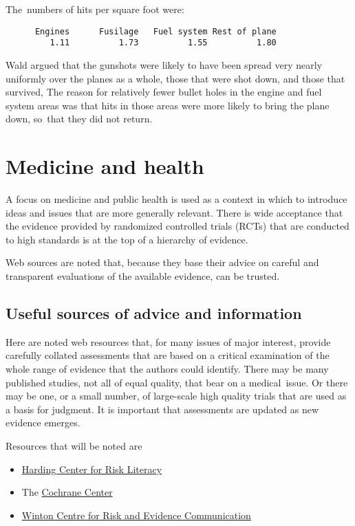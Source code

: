 \documentclass[
  10ptls,
  b5paper]{book}
\providecommand{\tightlist}{%
  \setlength{\itemsep}{0pt}\setlength{\parskip}{0pt}}
\begin{document}
The~numbers of hits per square foot were:

\begin{verbatim}
      Engines      Fusilage   Fuel system Rest of plane 
         1.11          1.73          1.55          1.80 
\end{verbatim}

Wald argued that the gunshots were likely to have been spread
very nearly uniformly over the planes as a whole, those that
were shot down, and those that survived, The reason for relatively
fewer bullet holes in the engine and fuel system areas was that
hits in those areas were more likely to bring the plane down,
so~that they did not return.

\hypertarget{medicine-and-health}{%
\chapter{Medicine and health}\label{medicine-and-health}}

A focus on medicine and public health is used as a context in which to
introduce ideas and issues that are more generally relevant. There is
wide acceptance that the evidence provided by randomized controlled
trials (RCTs) that are conducted to high standards is at the top of a
hierarchy of evidence.

Web sources are noted that, because they base their advice on careful
and transparent evaluations of the available evidence, can be trusted.

\hypertarget{useful-sources-of-advice-and-information}{%
\section{Useful sources of advice and information}\label{useful-sources-of-advice-and-information}}

Here are noted web resources that, for many issues of major interest,
provide carefully collated assessments that are based on a critical
examination of the whole range of evidence that the authors could
identify. There may be many published studies, not all of equal quality,
that bear on a medical~issue. Or there may be one, or a small number, of
large-scale high quality trials that are used as a basis for judgment.
It is important that assessments are updated as new evidence emerges.

Resources that will be noted are

\begin{itemize}
\tightlist
\item
  \href{https://www.hardingcenter.de/en}{Harding Center for Risk Literacy}
\item
  The \href{https://www.cochrane.org/}{Cochrane Center}
\item
  \href{https://wintoncentre.maths.cam.ac.uk/}{Winton Centre for Risk and Evidence
  Communication}
\end{itemize}
\end{document}
